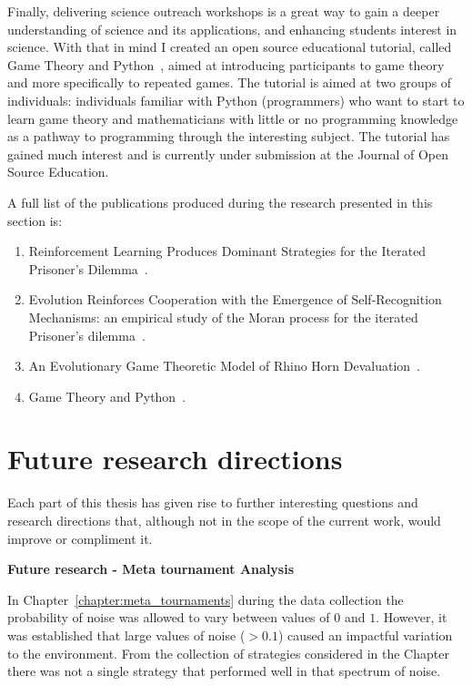 Finally, delivering science outreach workshops is a great way to gain a deeper
understanding of science and its applications, and enhancing students interest
in science. With that in mind I created an open source educational tutorial, called Game
Theory and Python~\cite{Glynatsi2017_game}, aimed at introducing participants to
game theory and more specifically to repeated games. The tutorial is
aimed at two groups of individuals: individuals familiar with Python (programmers) who want
to start to learn game theory and mathematicians with little or no programming
knowledge as a pathway to programming through the interesting subject. The
tutorial has gained much interest and is currently under submission at the
Journal of Open Source Education.

A full list of the publications produced during the research presented in this
section is:

\begin{enumerate}
    \item Reinforcement Learning Produces Dominant Strategies for the
    Iterated Prisoner's Dilemma~\cite{Knight2017}.
    \item Evolution Reinforces Cooperation with the Emergence of Self-Recognition
    Mechanisms: an empirical study of the Moran process for the iterated
    Prisoner's dilemma~\cite{KnightHGC17}.
    \item An Evolutionary Game Theoretic Model of Rhino Horn Devaluation~\cite{Glynatsi2018}.
    \item Game Theory and Python~\cite{Glynatsi2017_game}.
\end{enumerate}

\section{Future research directions}

Each part of this thesis has given rise to further interesting questions and
research directions that, although not in the scope of the current work, would
improve or compliment it.

\textbf{Future research - Meta tournament Analysis}

In Chapter~\ref{chapter:meta_tournaments} during the data collection the
probability of noise was allowed to vary between values of \(0\) and \(1\).
However, it was established that large values of noise (\(>
0.1\)) caused an impactful variation to the environment. From the collection of
\numberofstrategies strategies considered in the Chapter there was not a single
strategy that performed well in that spectrum of noise.

